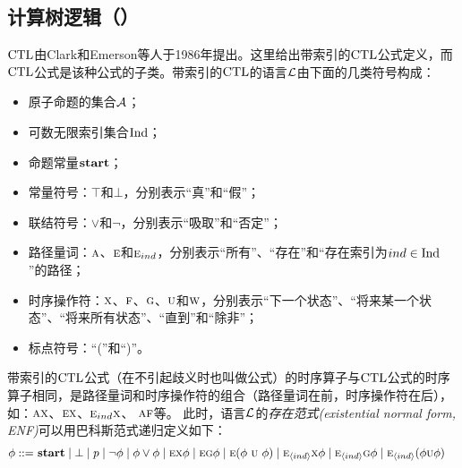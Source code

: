 \subsection{计算树逻辑（\CTL）}
$\textrm{CTL}$由Clark和Emerson等人于1986年提出\cite{DBLP:journals/toplas/ClarkeES86}。这里给出带索引的$\textrm{CTL}$公式定义，而$\textrm{CTL}$公式是该种公式的子类。带索引的$\textrm{CTL}$的语言${\cal L}$由下面的几类符号构成：
\begin{itemize}
	\item 原子命题的集合${\cal A}$；
	\item 可数无限索引集合$\textrm{Ind}$；
	\item 命题常量$\textbf{start}$；
	\item 常量符号：$\top$和$\bot$，分别表示“真”和“假”；
	\item 联结符号：$\vee$和$\neg$，分别表示“吸取”和“否定”；
	\item 路径量词：$\textsc{a}$、$\textsc{e}$和$\textsc{e}_{ind}$，分别表示“所有”、“存在”和“存在索引为$ind\in \textrm{Ind}$”的路径；
	\item 时序操作符：$\textsc{x}$、$\textsc{f}$、$\textsc{g}$、$\textsc{u}$和$\textsc{w}$，分别表示“下一个状态”、“将来某一个状态”、“将来所有状态”、“直到”和“除非”；
	\item 标点符号：“(”和“)”。
\end{itemize}
带索引的$\textrm{CTL}$公式（在不引起歧义时也叫做公式）的时序算子与$\textrm{CTL}$公式的时序算子相同，是路径量词和时序操作符的组合（路径量词在前，时序操作符在后），如：$\textsc{a} \textsc{x}$、$\textsc{e} \textsc{x}$、$\textsc{e}_{ind} \textsc{x}$、 $\textsc{a} \textsc{f}$等。
此时，语言$\cal L$的\emph{存在范式(existential normal form, ENF)}可以用巴科斯范式递归定义如下：
	\begin{align*}
	\phi  ::= & \ \start\mid \bot %
	\mid p \mid\neg\phi \mid \phi\lor\phi \mid
	\EXIST \NEXT \phi \mid
	\EXIST \GLOBAL \phi \mid
	\EXIST (\phi\ \UNTILL\ \phi)\mid
	\EXIST_{\tuple{ind}}\NEXT \phi  \mid
	\EXIST_{\tuple{ind}}\GLOBAL \phi \mid
	\EXIST_{\tuple{ind}}(\phi \UNTILL \phi) %
\end{align*}

